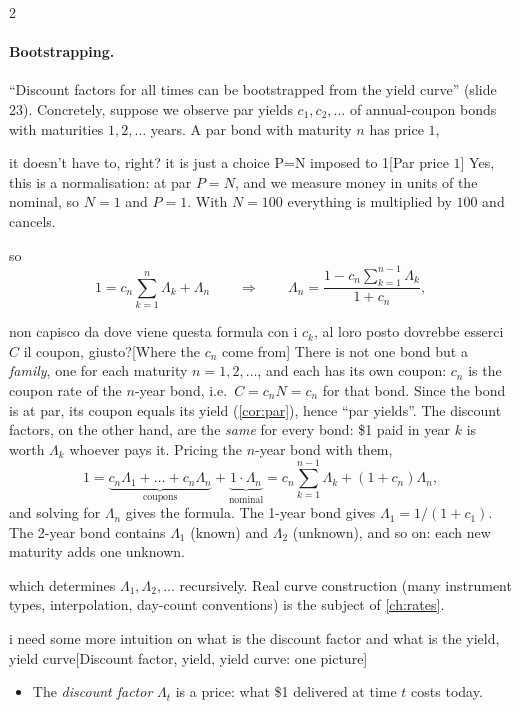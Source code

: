 \begin{paracol}{2}
\paragraph{Bootstrapping.} ``Discount factors for all times can be bootstrapped from the yield
curve'' (slide 23). Concretely, suppose we observe par yields $c_1, c_2, \dots$ of annual-coupon
bonds with maturities $1,2,\dots$ years. A par bond with maturity $n$ has price $1$, \begin{answer}{it doesn't have to, right? it is just a choice P=N imposed to 1}[Par price $1$]
Yes, this is a normalisation: at par $P=N$, and we measure money in units of the
nominal, so $N=1$ and $P=1$. With $N=100$ everything is multiplied by $100$ and cancels.
\end{answer} so
\[
  1 = c_n\sum_{k=1}^{n}\Lambda_k + \Lambda_n
  \qquad\Longrightarrow\qquad
  \Lambda_n = \frac{1 - c_n\sum_{k=1}^{n-1}\Lambda_k}{1+c_n},
\]\begin{answer}{non capisco da dove viene questa formula con i $c_k$, al loro posto dovrebbe esserci $C$ il coupon, giusto?}[Where the $c_n$ come from]
There is not one bond but a \emph{family}, one for each maturity $n=1,2,\dots$, and
each has its own coupon: $c_n$ is the coupon rate of the $n$-year bond, i.e.\ $C=c_nN=c_n$ for that bond.
Since the bond is at par, its coupon equals its yield (\cref{cor:par}), hence ``par yields''. The
discount factors, on the other hand, are the \emph{same} for every bond: \$1 paid in year $k$ is worth
$\Lambda_k$ whoever pays it. Pricing the $n$-year bond with them,
\[
  1 = \underbrace{c_n\Lambda_1+\dots+c_n\Lambda_n}_{\text{coupons}} + \underbrace{1\cdot\Lambda_n}_{\text{nominal}}
  = c_n\sum_{k=1}^{n-1}\Lambda_k + (1+c_n)\Lambda_n ,
\]
and solving for $\Lambda_n$ gives the formula. The 1-year bond gives $\Lambda_1=1/(1+c_1)$. The 2-year
bond contains $\Lambda_1$ (known) and $\Lambda_2$ (unknown), and so on: each new maturity adds one unknown.
\end{answer}
which determines $\Lambda_1,\Lambda_2,\ldots$ recursively. Real curve construction (many instrument
types, interpolation, day-count conventions) is the subject of \cref{ch:rates}. \begin{answer}{i need some more intuition on what is the discount factor and what is the yield, yield curve}[Discount factor, yield, yield curve: one picture]
\begin{itemize}
  \item The \emph{discount factor} $\Lambda_t$ is a price: what \$1 delivered at time $t$ costs today.

\end{itemize}
\end{answer}
\end{paracol}
